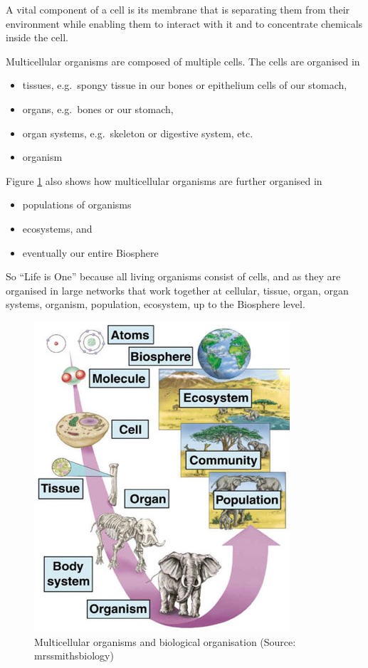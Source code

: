 \documentclass[
  11pt,
]{book}
\providecommand{\tightlist}{%
  \setlength{\itemsep}{0pt}\setlength{\parskip}{0pt}}
\begin{document}
A vital component of a cell is its membrane that is separating them from their environment while enabling them to interact with it and to concentrate chemicals inside the cell.

Multicellular organisms are composed of multiple cells. The cells are organised in

\begin{itemize}
\tightlist
\item
  tissues, e.g.~spongy tissue in our bones or epithelium cells of our stomach,
\item
  organs, e.g.~bones or our stomach,
\item
  organ systems, e.g.~skeleton or digestive system, etc.
\item
  organism
\end{itemize}

Figure \ref{fig:multiCellular} also shows how multicellular organisms are further organised in

\begin{itemize}
\tightlist
\item
  populations of organisms
\item
  ecosystems, and
\item
  eventually our entire Biosphere
\end{itemize}

So ``Life is One'' because all living organisms consist of cells, and as they are organised in large networks that work together at cellular, tissue, organ, organ systems, organism, population, ecosystem, up to the Biosphere level.

\begin{figure}

{\centering \includegraphics[width=0.3\linewidth]{./figs/organisationMulticellular} 

}

\caption{Multicellular organisms and biological organisation (Source: mrssmithsbiology)}\label{fig:multiCellular}
\end{figure}
\end{document}
